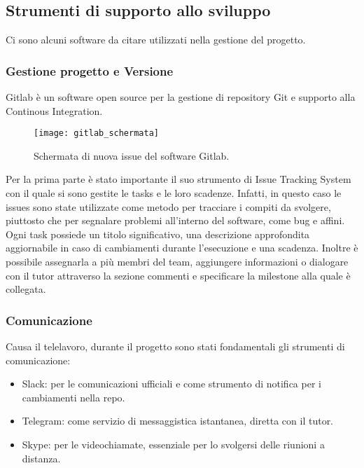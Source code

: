 \subsection{Strumenti di supporto allo sviluppo}
Ci sono alcuni software da citare utilizzati nella gestione del progetto.

\subsubsection{Gestione progetto e Versione}
Gitlab è un software open source per la gestione di repository \gls{Git} e supporto alla Continous Integration.

\begin{figure}[htbp]
	\begin{center}
		\texttt{[image: gitlab\_schermata]}
	\end{center}
	\caption {Schermata di nuova issue del software Gitlab.}
\end{figure}

\noindent Per la prima parte è stato importante il suo strumento di \gls{Issue Tracking System} con il quale si sono gestite le tasks e le
loro scadenze. Infatti, in questo caso le issues sono state utilizzate come metodo per tracciare i compiti da svolgere, piuttosto che per
segnalare problemi all'interno del software, come bug e affini. \\
\noindent Ogni task possiede un titolo significativo, una descrizione approfondita aggiornabile in caso di cambiamenti durante l'esecuzione
e una scadenza. Inoltre è possibile assegnarla a più membri del team, aggiungere informazioni o dialogare con il tutor attraverso la sezione
commenti e specificare la milestone alla quale è collegata.

\subsubsection{Comunicazione}
Causa il telelavoro, durante il progetto sono stati fondamentali gli strumenti di comunicazione:
\begin{itemize}
  \item Slack: per le comunicazioni ufficiali e come strumento di notifica per i cambiamenti nella repo.
  \item Telegram: come servizio di messaggistica istantanea, diretta con il tutor.
	\item Skype: per le videochiamate, essenziale per lo svolgersi delle riunioni a distanza.
\end{itemize}

